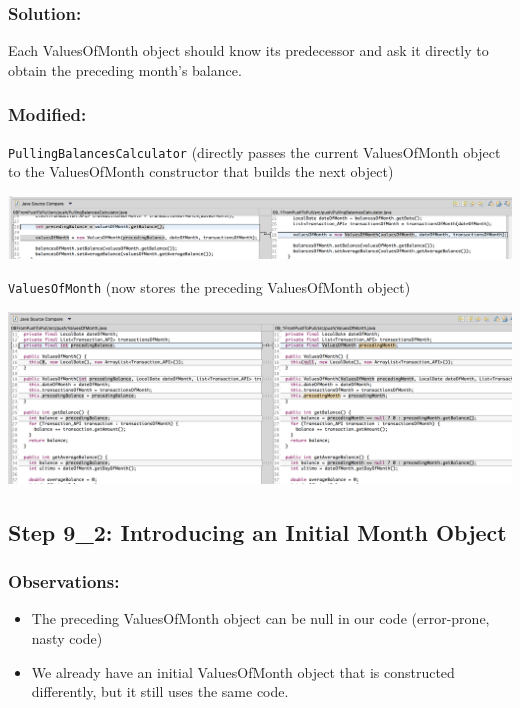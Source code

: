 \documentclass[a4paper,fleqn,titlepage,11pt]{article}
\begin{document}
\subsubsection*{Solution:}

Each ValuesOfMonth object should know its predecessor and ask it directly to obtain the preceding month's balance.

\subsubsection*{Modified:}

\texttt{PullingBalancesCalculator} (directly passes the current ValuesOfMonth object to the ValuesOfMonth constructor that builds the next object)

\includegraphics[width=1\textwidth]{CompareViews/08-09_1-1.png}

\texttt{ValuesOfMonth} (now stores the preceding ValuesOfMonth object)

\includegraphics[width=1\textwidth]{CompareViews/08-09_1-2.png}



\subsection*{Step 9\_2: Introducing an Initial Month Object}

\subsubsection*{Observations:}
\begin{itemize}
\item The preceding ValuesOfMonth object can be null in our code (error-prone, nasty code)
\item We already have an initial ValuesOfMonth object that is constructed differently, but it still uses the same code.
\end{itemize}
\end{document}
